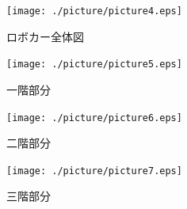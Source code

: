 \documentclass[11pt,a4paper]{jsarticle}
\begin{document}
\begin{figure}[hb]
 \begin{center}
  \texttt{[image: ./picture/picture4.eps]}
  \caption{ロボカー全体図}
  \label{fig:robocar}
 \end{center}
\end{figure}

\begin{figure}[hb]
 \begin{center}
  \texttt{[image: ./picture/picture5.eps]}
  \caption{一階部分}
  \label{fig:1F}
 \end{center}
\end{figure}

\begin{figure}[hb]
 \begin{center}
  \texttt{[image: ./picture/picture6.eps]}
  \caption{二階部分}
  \label{fig:2F}
 \end{center}
\end{figure}

\begin{figure}[hb]
 \begin{center}
  \texttt{[image: ./picture/picture7.eps]}
  \caption{三階部分}
  \label{fig:3F}
 \end{center}
\end{figure}
\end{document}
